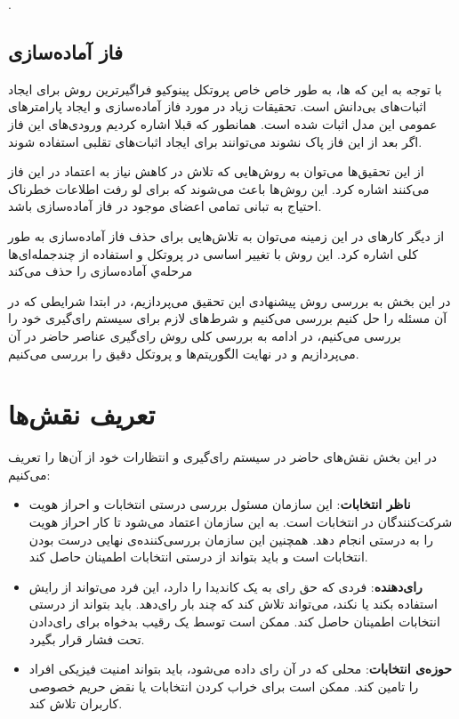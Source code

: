 . 
\subsection{فاز آماده‌سازی}
با توجه به این که 
‌ها، به طور خاص خاص پروتکل پینوکیو
فراگیرترین روش برای ایجاد اثبات‌های بی‌دانش است. تحقیقات زیاد در مورد فاز آماده‌سازی و ایجاد پارامترهای عمومی این مدل اثبات شده است. همانطور که قبلا اشاره کردیم ورودی‌های این فاز اگر بعد از این فاز پاک نشوند می‌توانند برای ایجاد اثبات‌های تقلبی استفاده شوند.
\par
از این تحقیق‌ها می‌توان به روش‌هایی
\cite{znsetup} \cite{multipartyparams}
 که تلاش در کاهش نیاز به اعتماد در این فاز می‌کنند اشاره کرد. این روش‌ها باعث می‌شوند که برای لو رفت اطلاعات خطرناک احتیاج به تبانی تمامی اعضای موجود در فاز آماده‌سازی باشد.
 \par
 از دیگر کارهای در این زمینه می‌توان به تلاش‌هایی برای حذف فاز آماده‌سازی به طور کلی اشاره کرد. این روش‌ با تغییر اساسی در پروتکل و استفاده از چندجمله‌ای‌ها 
 \cite{nosetup}
 مرحله‌ي آماده‌سازی را حذف می‌کند

در این بخش به بررسی روش پیشنهادی این تحقیق می‌پردازیم، در ابتدا شرایطی که در آن مسئله را حل کنیم بررسی می‌کنیم و شرط‌های لازم برای سیستم‌ رای‌گیری خود را بررسی می‌کنیم، در ادامه به بررسی کلی روش رای‌گیری عناصر حاضر در آن می‌پردازیم و در نهایت الگوریتم‌ها و پروتکل دقیق را بررسی می‌کنیم.

\section{تعریف نقش‌ها}
در این بخش نقش‌های حاضر در سیستم رای‌گیری و انتظارات خود از آن‌ها را تعریف می‌کنیم:
\begin{itemize}
	\item
	\textbf{ناظر انتخابات}:
	این سازمان مسئول بررسی درستی انتخابات و احراز هویت شرکت‌کنندگان در انتخابات است. به این سازمان اعتماد می‌شود تا کار احراز هویت را به درستی انجام دهد. همچنین این سازمان بررسی‌کننده‌ی نهایی درست بودن انتخابات است و باید بتواند از درستی انتخابات اطمینان حاصل کند.
	\item
	\textbf{رای‌دهنده}:
	فردی که حق رای به یک کاندیدا را دارد، این فرد می‌تواند از رایش استفاده بکند یا نکند، می‌تواند تلاش کند که چند بار رای‌دهد. باید بتواند از درستی انتخابات اطمینان حاصل کند. ممکن است توسط یک رقیب بدخواه برای رای‌دادن تحت فشار قرار بگیرد.
	\item
	\textbf{حوزه‌ی انتخابات}:
	محلی که در آن رای داده می‌شود، باید بتواند امنیت فیزیکی افراد را تامین کند. ممکن است برای خراب کردن انتخابات یا نقض حریم خصوصی کاربران تلاش کند. 
\end{itemize}
